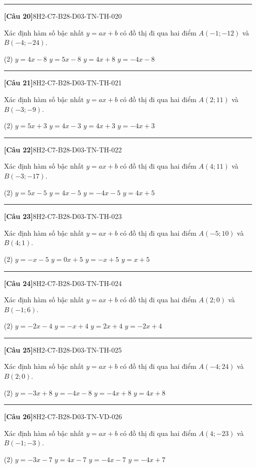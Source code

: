 \documentclass[12pt,a4paper]{article}
\newif\ifloigiai
\newenvironment{cauhoi}[2]{%
  \par\medskip\noindent\rule{\textwidth}{0.4pt}\par\nopagebreak
  \noindent\textbf{[#1]}\hfill{\scriptsize\ttfamily #2}\par\nopagebreak\smallskip}{\par}
\newcommand{\dapan}[1]{\ifloigiai\par\smallskip\noindent\textit{Đáp án:} \textbf{#1}\par\fi}
\begin{document}
\begin{cauhoi}{Câu 20}{8H2-C7-B28-D03-TN-TH-020}
Xác định hàm số bậc nhất $y=ax+b$ có đồ thị đi qua hai điểm $A(-1;-12)$ và $B(-4;-24)$.
\begin{tasks}(2)
\task $y=4x-8$
\task $y=5x-8$
\task $y=4x+8$
\task $y=-4x-8$
\end{tasks}
\dapan{A}
\end{cauhoi}
\begin{cauhoi}{Câu 21}{8H2-C7-B28-D03-TN-TH-021}
Xác định hàm số bậc nhất $y=ax+b$ có đồ thị đi qua hai điểm $A(2;11)$ và $B(-3;-9)$.
\begin{tasks}(2)
\task $y=5x+3$
\task $y=4x-3$
\task $y=4x+3$
\task $y=-4x+3$
\end{tasks}
\dapan{C}
\end{cauhoi}
\begin{cauhoi}{Câu 22}{8H2-C7-B28-D03-TN-TH-022}
Xác định hàm số bậc nhất $y=ax+b$ có đồ thị đi qua hai điểm $A(4;11)$ và $B(-3;-17)$.
\begin{tasks}(2)
\task $y=5x-5$
\task $y=4x-5$
\task $y=-4x-5$
\task $y=4x+5$
\end{tasks}
\dapan{B}
\end{cauhoi}
\begin{cauhoi}{Câu 23}{8H2-C7-B28-D03-TN-TH-023}
Xác định hàm số bậc nhất $y=ax+b$ có đồ thị đi qua hai điểm $A(-5;10)$ và $B(4;1)$.
\begin{tasks}(2)
\task $y=-x-5$
\task $y=0x+5$
\task $y=-x+5$
\task $y=x+5$
\end{tasks}
\dapan{C}
\end{cauhoi}
\begin{cauhoi}{Câu 24}{8H2-C7-B28-D03-TN-TH-024}
Xác định hàm số bậc nhất $y=ax+b$ có đồ thị đi qua hai điểm $A(2;0)$ và $B(-1;6)$.
\begin{tasks}(2)
\task $y=-2x-4$
\task $y=-x+4$
\task $y=2x+4$
\task $y=-2x+4$
\end{tasks}
\dapan{D}
\end{cauhoi}
\begin{cauhoi}{Câu 25}{8H2-C7-B28-D03-TN-TH-025}
Xác định hàm số bậc nhất $y=ax+b$ có đồ thị đi qua hai điểm $A(-4;24)$ và $B(2;0)$.
\begin{tasks}(2)
\task $y=-3x+8$
\task $y=-4x-8$
\task $y=-4x+8$
\task $y=4x+8$
\end{tasks}
\dapan{C}
\end{cauhoi}
\begin{cauhoi}{Câu 26}{8H2-C7-B28-D03-TN-VD-026}
Xác định hàm số bậc nhất $y=ax+b$ có đồ thị đi qua hai điểm $A(4;-23)$ và $B(-1;-3)$.
\begin{tasks}(2)
\task $y=-3x-7$
\task $y=4x-7$
\task $y=-4x-7$
\task $y=-4x+7$
\end{tasks}
\dapan{C}
\end{cauhoi}
\end{document}

